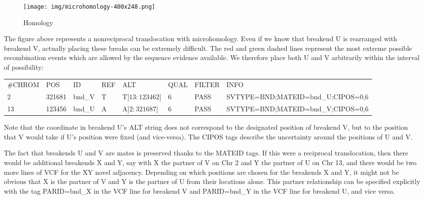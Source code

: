 \documentclass[8pt]{article}
\begin{document}
\begin{figure}[h]
\centering
\texttt{[image: img/microhomology-400x248.png]}
\caption{Homology}
\end{figure}

The figure above represents a nonreciprocal translocation with microhomology. Even if we know that breakend U is rearranged with breakend V, actually placing these breaks can be extremely difficult. The red and green dashed lines represent the most extreme possible recombination events which are allowed by the sequence evidence available. We therefore place both U and V arbitrarily within the interval of possibility:

\vspace{0.3cm}
\footnotesize
\begin{tabular}{ l l l l l l l l }
\#CHROM & POS & ID & REF & ALT & QUAL & FILTER & INFO \\
2 & 321681 & bnd\_V & T & T$]13:123462]$ & 6 & PASS & SVTYPE=BND;MATEID=bnd\_U;CIPOS=0,6 \\
13 & 123456 & bnd\_U & A & A$]2:321687]$ & 6 & PASS & SVTYPE=BND;MATEID=bnd\_V;CIPOS=0,6 \\
\end{tabular}
\normalsize
\vspace{0.3cm}

Note that the coordinate in breakend U's ALT string does not correspond to the designated position of breakend V, but to the position that V would take if U's position were fixed (and vice-versa). The CIPOS tags describe the uncertainty around the positions of U and V.

The fact that breakends U and V are mates is preserved thanks to the MATEID tags. If this were a reciprocal translocation, then there would be additional breakends X and Y, say with X the partner of V on Chr 2 and Y the partner of U on Chr 13, and there would be two more lines of VCF for the XY novel adjacency. Depending on which positions are chosen for the breakends X and Y, it might not be obvious that X is the partner of V and Y is the partner of U from their locations alone. This partner relationship can be specified explicitly with the tag PARID=bnd\_X in the VCF line for breakend V and PARID=bnd\_Y in the VCF line for breakend U, and vice versa.
\end{document}
